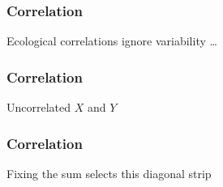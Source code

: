 \documentclass[handout]{beamer}
\begin{document}
   \begin{frame}
   \frametitle{Correlation}
   \begin{center}
   \end{center}
   Ecological correlations ignore variability \dots
   \end{frame}



   \begin{frame}
   \frametitle{Correlation}
   \begin{center}
   \end{center}
   Uncorrelated $X$ and $Y$
   \end{frame}



   \begin{frame}
   \frametitle{Correlation}
   \begin{center}
   \end{center}
   Fixing the sum selects this diagonal strip
   \end{frame}
\end{document}
